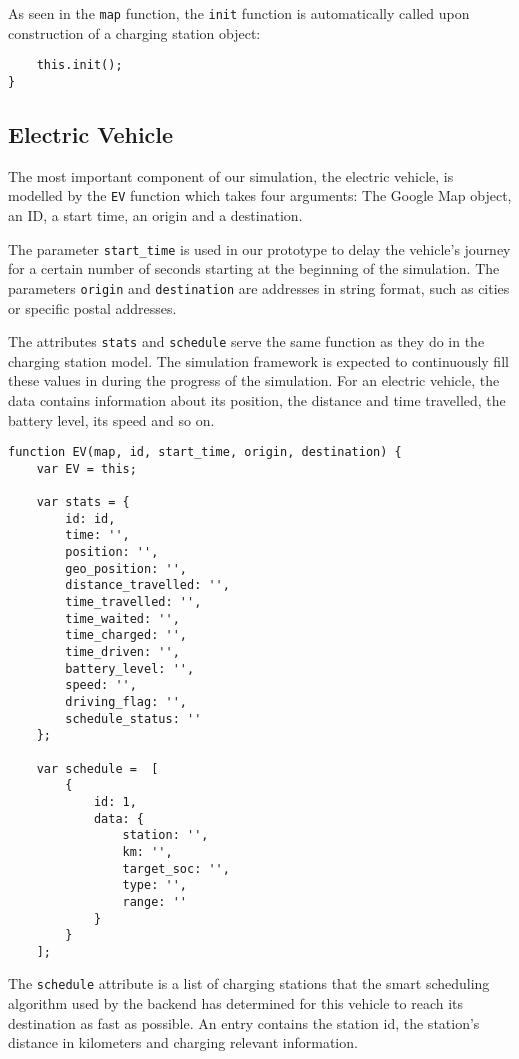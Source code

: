 As seen in the \texttt{map} function, the \texttt{init} function is automatically called upon construction of a charging station object:

\begin{verbatim}
    this.init();
}
\end{verbatim}


\newpage
\subsection{Electric Vehicle}

The most important component of our simulation, the electric vehicle, is modelled by the \texttt{EV} function which takes four arguments: The Google Map object, an ID, a start time, an origin and a destination.

The parameter \texttt{start\_time} is used in our prototype to delay the vehicle's journey for a certain number of seconds starting at the beginning of the simulation. The parameters \texttt{origin} and \texttt{destination} are addresses in string format, such as cities or specific postal addresses.

The attributes \texttt{stats} and \texttt{schedule} serve the same function as they do in the charging station model. The simulation framework is expected to continuously fill these values in during the progress of the simulation. For an electric vehicle, the data contains information about its position, the distance and time travelled, the battery level, its speed and so on.

\begin{verbatim}
function EV(map, id, start_time, origin, destination) {
    var EV = this;

    var stats = {
        id: id,
        time: '',
        position: '',
        geo_position: '',
        distance_travelled: '',
        time_travelled: '',
        time_waited: '',
        time_charged: '',
        time_driven: '',
        battery_level: '',
        speed: '',
        driving_flag: '',
        schedule_status: ''
    };

    var schedule =  [
        {
            id: 1,
            data: {
                station: '',
                km: '',
                target_soc: '',
                type: '',
                range: ''
            }
        }
    ];
\end{verbatim}

The \texttt{schedule} attribute is a list of charging stations that the smart scheduling algorithm used by the backend has determined for this vehicle to reach its destination as fast as possible. An entry contains the station id, the station's distance in kilometers and charging relevant information.

